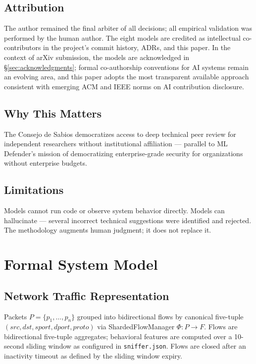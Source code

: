 \documentclass[11pt,a4paper]{article}
\begin{document}
    \subsection{Attribution}

    The author remained the final arbiter of all decisions; all empirical validation was
    performed by the human author. The eight models are credited as intellectual co-contributors
    in the project's commit history, ADRs, and this paper. In the context of arXiv submission,
    the models are acknowledged in \S\ref{sec:acknowledgments}; formal co-authorship conventions
    for AI systems remain an evolving area, and this paper adopts the most transparent available
    approach consistent with emerging ACM and IEEE norms on AI contribution disclosure.

    \subsection{Why This Matters}

    The Consejo de Sabios democratizes access to deep technical peer review for independent
    researchers without institutional affiliation --- parallel to ML Defender's mission of
    democratizing enterprise-grade security for organizations without enterprise budgets.

    \subsection{Limitations}

    Models cannot run code or observe system behavior directly. Models can hallucinate --- several
    incorrect technical suggestions were identified and rejected. The methodology augments human
    judgment; it does not replace it.

    \section{Formal System Model}

    \subsection{Network Traffic Representation}

    Packets $P = \{p_1, \dots, p_n\}$ grouped into bidirectional flows by canonical five-tuple
    $(src, dst, sport, dport, proto)$ via ShardedFlowManager $\Phi : P \rightarrow F$. Flows
    are bidirectional five-tuple aggregates; behavioral features are computed over a 10-second
    sliding window as configured in \texttt{sniffer.json}. Flows are closed after an inactivity
    timeout as defined by the sliding window expiry.
\end{document}
